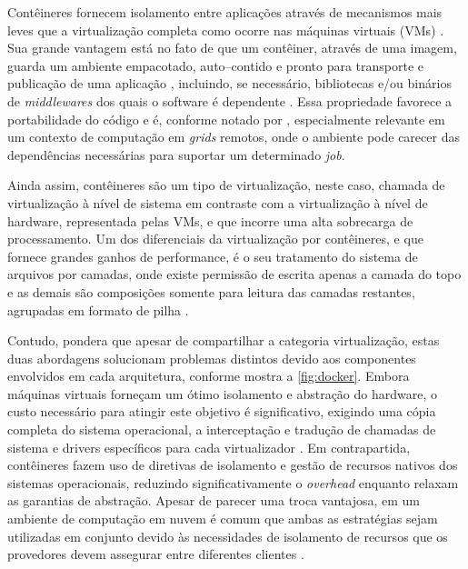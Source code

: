 \documentclass[english,brazilian]{UNISINOSmonografia} %
\begin{document}
Contêineres fornecem isolamento entre aplicações através de mecanismos mais leves que a virtualização completa como ocorre nas máquinas virtuais (VMs) \cite{Awada2017}.
Sua grande vantagem está no fato de que um contêiner, através de uma imagem, guarda um ambiente empacotado, auto--contido e pronto para transporte e publicação de uma aplicação \cite{Pahl2015a}, incluindo, se necessário, bibliotecas e/ou binários de \textit{middlewares} dos quais o software é dependente \cite{Awada2017}.
Essa propriedade favorece a portabilidade do código e é, conforme notado por , especialmente relevante em um contexto de computação em \textit{grids} remotos, onde o ambiente pode carecer das dependências necessárias para suportar um determinado \textit{job}.


Ainda assim, contêineres são um tipo de virtualização, neste caso, chamada de virtualização à nível de sistema \cite{Tosatto2015} em contraste com a virtualização à nível de hardware, representada pelas VMs, e que incorre uma alta sobrecarga de processamento.
Um dos diferenciais da virtualização por contêineres, e que fornece grandes ganhos de performance, é o seu tratamento do sistema de arquivos por camadas, onde existe permissão de escrita apenas a camada do topo e as demais são composições somente para leitura das camadas restantes, agrupadas em formato de pilha \cite{Higgins2015}.



Contudo,  pondera que apesar de compartilhar a categoria virtualização, estas duas abordagens solucionam problemas distintos devido aos componentes envolvidos em cada arquitetura, conforme mostra a \autoref{fig:docker}.
Embora máquinas virtuais forneçam um ótimo isolamento e abstração do hardware, o custo necessário para atingir este objetivo é significativo, exigindo uma cópia completa do sistema operacional, a interceptação e tradução de chamadas de sistema e drivers específicos para cada virtualizador \cite{Felter2015}.
Em contrapartida, contêineres fazem uso de diretivas de isolamento e gestão de recursos nativos dos sistemas operacionais, reduzindo significativamente o \textit{overhead} enquanto relaxam as garantias de abstração.
Apesar de parecer uma troca vantajosa, em um ambiente de computação em nuvem é comum que ambas as estratégias sejam utilizadas em conjunto devido às necessidades de isolamento de recursos que os provedores devem assegurar entre diferentes clientes \cite{Bernstein2014}.
\end{document}
